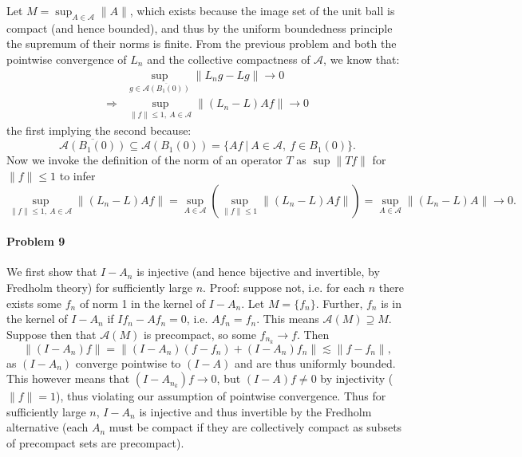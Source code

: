 \documentclass[12pt]{article}
\begin{document}
Let $M = \sup_{A \in \mathcal{A}}\|A\|$, which exists because the image set of the
unit ball is compact (and hence bounded), and thus by the uniform boundedness
principle the supremum of their norms is finite. From the previous problem and
both the pointwise convergence of $L_n$ and the collective compactness of
$\mathcal{A}$, we know that:
\begin{align*}
  & \sup_{g\in \overline{\mathcal{A}(B_1(0))}}\|L_ng-Lg\| \to 0\\
  \Rightarrow &\sup_{\|f\| \leq 1,\ A\in \mathcal{A}}\|(L_n-L)Af\| \to 0
\end{align*}
the first implying the second because:
\begin{displaymath}
  \overline{\mathcal{A}(B_1(0))} \subseteq \mathcal{A}(B_1(0)) =
  \{Af\ |\ A\in \mathcal{A},\ f\in B_1(0)\}.
\end{displaymath}
Now we invoke the definition of the norm of an operator $T$ as $\sup\|Tf\|$
for $\|f\|\leq 1$ to infer
\begin{displaymath}
  \sup_{\|f\|\leq 1,\ A\in \mathcal{A}}\|(L_n-L)Af\| = \sup_{A\in\mathcal{A}}
  (\sup_{\|f\|\leq 1}\|(L_n-L)Af\|) = \sup_{A\in\mathcal{A}}\|(L_n-L)A\|\to 0.
\end{displaymath}

\paragraph{Problem 9}

We first show that $I-A_n$ is injective (and hence bijective and invertible,
by Fredholm theory) for sufficiently large $n$. Proof: suppose not, i.e. for
each $n$ there exists some $f_n$ of norm 1 in the kernel of $I-A_n$. Let $M =
\{f_n\}$. Further, $f_n$ is in the kernel of $I-A_n$ if $If_n - Af_n = 0$,
i.e. $Af_n = f_n$. This means $\mathcal{A}(M) \supseteq M$. Suppose then that
$\mathcal{A}(M)$ is precompact, so some $f_{n_k} \to f$. Then
\begin{displaymath}
  \|(I-A_n)f\| = \|(I-A_n)(f-f_n)+(I-A_n)f_n\|
  \lesssim \|f-f_n\|,
\end{displaymath}
as $(I-A_n)$ converge pointwise to $(I-A)$ and are thus uniformly bounded. This
however means that $(I-A_{n_k})f \to 0$, but $(I-A)f \neq 0$ by injectivity ($\|f\|
= 1$), thus violating our assumption of pointwise convergence. Thus for
sufficiently large $n$, $I-A_n$ is injective and thus invertible by the Fredholm
alternative (each $A_n$ must be compact if they are collectively compact as
subsets of precompact sets are precompact).
\end{document}
